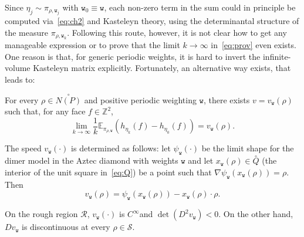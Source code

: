 \documentclass[AHL,Unicode,longabstracts,published]{cedram}
\newcommand{\ttw}{\mathtt{w}}
\newcommand{\bbE}{\mathbb{E}}
\newcommand{\bbZ}{\mathbb{Z}}
\newcommand{\clS}{\mathcal{S}}
\newcommand{\clR}{\mathcal{R}}
\newcommand{\ttw}{\mathtt{w}}
\begin{document}
Since $\eta_j\sim \pi_{\rho,\ttw_j}$ with $\ttw_0\equiv \ttw$, each non-zero term in the sum could in principle be computed via~\eqref{eq:ch2} and Kasteleyn theory, using the determinantal structure of the measure $\pi_{\rho,\ttw_k}$. Following this route, however, it is not clear how to get any manageable expression or to prove that the limit $k\to\infty$ in~\eqref{eq:prov} even exists. One reason is that, for generic periodic weights, it is hard to invert the infinite-volume Kasteleyn matrix explicitly. Fortunately, an alternative way exists, that leads to:
\begin{theo}\label{th:1}
For every $\rho\in\stackrel\circ{N(P)}$ and positive periodic weighting $\ttw$, there exists $v=v_{\ttw}(\rho)$ such that, for any face $f\in \bbZ^2$,
\begin{equation}\label{eq:v}
\lim_{k\to\infty}\frac1k\bbE_{\pi_{\rho,{\ttw}}} \left(h_{\eta_{k}}(f)-h_{\eta_{0}}(f)\right)=v_{\ttw}(\rho).
\end{equation}


The speed $v_{\ttw}(\cdot)$ is determined as follows: let $\psi_{\ttw}(\cdot)$ be the limit shape for the dimer model in the Aztec diamond with weights $\ttw$ and let $x_{\ttw}(\rho)\in \stackrel\circ Q$ (the interior of the unit square in~\eqref{eq:Q}) be a point such that $\nabla \psi_{\ttw}(x_{\ttw}(\rho))=\rho$. Then
\begin{equation}\label{eq:chiev}
v_{\ttw}(\rho)=\psi_{\ttw}(x_{\ttw}(\rho))-x_{\ttw}(\rho)\cdot \rho.
\end{equation}

On the rough region $\clR$, $v_{\ttw}(\cdot)$ is $C^\infty$and $\det(D^2 v_{\ttw})< 0$. On the other hand, $D v_{\ttw}$ is discontinuous at every $\rho\in \clS$.
\end{theo}
\end{document}
